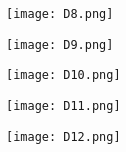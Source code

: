 \documentclass{article}
\begin{document}
\begin{figure}[!hb]
\centering
\texttt{[image:  D8.png]}
\end{figure}

\begin{figure}[!hb]
\centering
\texttt{[image:  D9.png]}
\end{figure}

\begin{figure}[!hb]
\centering
\texttt{[image:  D10.png]}
\end{figure}

\begin{figure}[!hb]
\centering
\texttt{[image:  D11.png]}
\end{figure}

\begin{figure}[!hb]
\centering
\texttt{[image:  D12.png]}
\end{figure}
\end{document}

